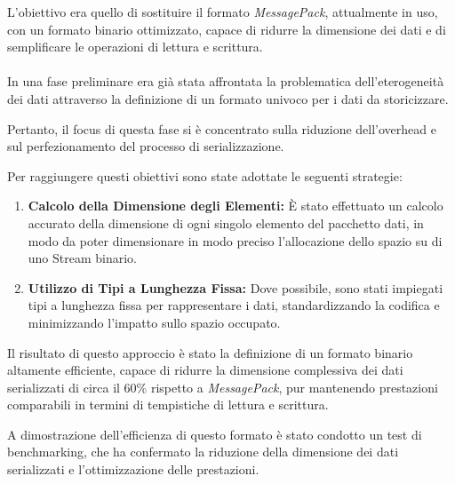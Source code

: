 \documentclass[12pt,a4paper,openright,twoside]{book}
\begin{document}
            L’obiettivo era quello di sostituire il formato \textit{MessagePack}, attualmente in uso, con un formato binario ottimizzato, capace di ridurre la dimensione dei dati e di semplificare le operazioni di lettura e scrittura.

            \paragraph*{}

            In una fase preliminare era già stata affrontata la problematica dell’eterogeneità dei dati attraverso la definizione di un formato univoco per i dati da storicizzare.

            Pertanto, il focus di questa fase si è concentrato sulla riduzione dell’overhead e sul perfezionamento del processo di serializzazione.

            Per raggiungere questi obiettivi sono state adottate le seguenti strategie:
            \begin{enumerate}
                \item \textbf{Calcolo della Dimensione degli Elementi:} È stato effettuato un calcolo accurato della dimensione di ogni singolo elemento del pacchetto dati, in modo da poter dimensionare in modo preciso l’allocazione dello spazio su di uno Stream binario.
                \item \textbf{Utilizzo di Tipi a Lunghezza Fissa:} Dove possibile, sono stati impiegati tipi a lunghezza fissa per rappresentare i dati, standardizzando la codifica e minimizzando l’impatto sullo spazio occupato.
            \end{enumerate}

            Il risultato di questo approccio è stato la definizione di un formato binario altamente efficiente, capace di ridurre la dimensione complessiva dei dati serializzati di circa il 60\% rispetto a \textit{MessagePack}, pur mantenendo prestazioni comparabili in termini di tempistiche di lettura e scrittura.

            A dimostrazione dell'efficienza di questo formato è stato condotto un test di benchmarking, che ha confermato la riduzione della dimensione dei dati serializzati e l'ottimizzazione delle prestazioni.
\end{document}
